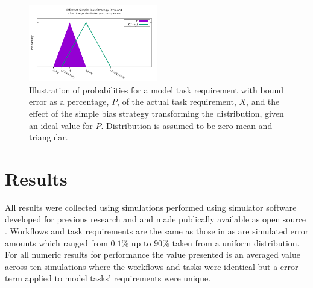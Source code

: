 \documentclass[10pt]{csce}
\begin{document}
\begin{figure}
	\begin{center}
		\includegraphics[width=0.5\textwidth]{figures/BiasVisualization_Simple.pdf}
	\end{center}
	\caption{Illustration of probabilities for a model task requirement
		with bound error as a percentage, $P$, of the actual task
		requirement, $X$, and the effect of the simple bias strategy
		transforming the distribution, given an ideal value for $P$.
		Distribution is assumed to be zero-mean and triangular.}
	\label{fig:cpbias}
\end{figure}

\section{Results}
\label{sec:Results}

All results were collected using simulations performed using simulator software
developed for previous research \cite{costmin} and \cite{pdpta18} and made
publically available as open source \cite{soasim}.  Workflows and task
requirements are the same as those in \cite{pdpta18} as are simulated error
amounts which ranged from $0.1\%$ up to $90\%$ taken from a uniform
distribution.  For all numeric results for performance the value presented is
an averaged value across ten simulations where the workflows and tasks were
identical but a error term applied to model tasks' requirements were unique.
\end{document}
